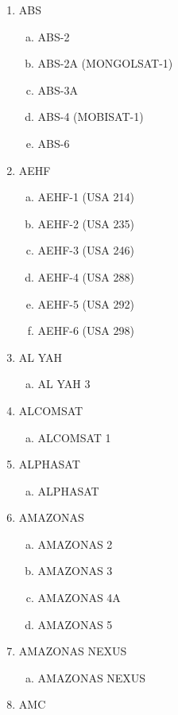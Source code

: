 \begin{multicols}{2}
\begin{enumerate}
  \item ABS
  \begin{enumerate}[a.]
    \item ABS-2
    \item ABS-2A (MONGOLSAT-1)
    \item ABS-3A
    \item ABS-4 (MOBISAT-1)
    \item ABS-6
  \end{enumerate}
  \item AEHF
  \begin{enumerate}[a.]
    \item AEHF-1 (USA 214)
    \item AEHF-2 (USA 235)
    \item AEHF-3 (USA 246)
    \item AEHF-4 (USA 288)
    \item AEHF-5 (USA 292)
    \item AEHF-6 (USA 298)
  \end{enumerate}
  \item AL YAH
  \begin{enumerate}[a.]
    \item AL YAH 3
  \end{enumerate}
  \item ALCOMSAT
  \begin{enumerate}[a.]
    \item ALCOMSAT 1
  \end{enumerate}
  \item ALPHASAT
  \begin{enumerate}[a.]
    \item ALPHASAT
  \end{enumerate}
  \item AMAZONAS
  \begin{enumerate}[a.]
    \item AMAZONAS 2
    \item AMAZONAS 3
    \item AMAZONAS 4A
    \item AMAZONAS 5
  \end{enumerate}
  \item AMAZONAS NEXUS
  \begin{enumerate}[a.]
    \item AMAZONAS NEXUS
  \end{enumerate}
  \item AMC

\end{enumerate}
\end{multicols}
